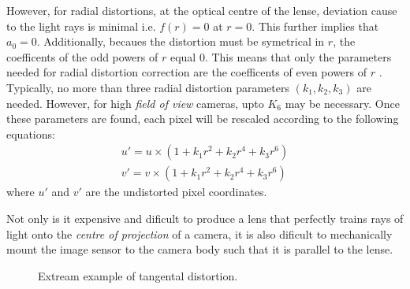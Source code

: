\documentclass{UoNMCHA}
\numberwithin{equation}{section}
\begin{document}
However, for radial distortions, at the optical centre of the lense, deviation cause to the light rays is minimal i.e. $f(r) = 0$ at $r = 0$. This further implies that $a_0 = 0$. Additionally, becaues the distortion must be symetrical in $r$, the coefficents of the odd powers of $r$ equal $0$. This means that only the parameters needed for radial distortion correction are the coefficents of even powers of $r$ \cite{learningOpenCV}. Typically, no more than three radial distortion parameters $(k_{1}, k_{2}, k_{3})$ are needed. However, for high \textit{field of view} cameras, upto $K_{6}$ may be necessary. Once these parameters are found, each pixel will be rescaled according to the following equations:
\begin{equation}\label{eq:radialParameters}
	\begin{split}
	u' = u\times(1+k_{1}r^{2} + k_{2}r^{4} + k_{3}r^{6})\\
	v' = v\times(1+k_{1}r^{2} + k_{2}r^{4} + k_{3}r^{6})
	\end{split}
\end{equation}
where $u'$ and $v'$ are the undistorted pixel coordinates.

Not only is it expensive and dificult to produce a lens that perfectly trains rays of light onto the \textit{centre of projection} of a camera, it is also dificult to mechanically mount the image sensor to the camera body such that it is parallel to the lense.

\begin{figure}[ht]
	\caption{Extream example of tangental distortion.}	
	\label{fig:RadialDistortion}
\end{figure}
\end{document}
